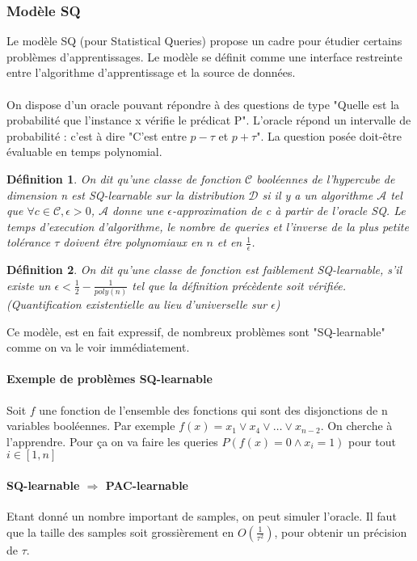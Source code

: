 \documentclass{article}		%
\newtheorem{defi}{Définition}
\theoremstyle{definition}
\theoremstyle{plain}
\begin{document}
\subsubsection{Modèle SQ}
Le modèle SQ (pour Statistical Queries) propose un cadre pour étudier
certains problèmes d'apprentissages. Le modèle se définit comme une
interface restreinte entre l'algorithme d'apprentissage et la source de
données.
\\
\\
On dispose d'un oracle pouvant répondre à des questions de type "Quelle
est la probabilité que l'instance x vérifie le prédicat P". L'oracle
répond un intervalle de probabilité : c'est à dire "C'est entre
$p - \tau$ et $p + \tau$". La question posée doit-être évaluable
en temps polynomial.
\\
\begin{defi}
On dit qu'une classe de fonction $\mathcal{C}$ booléennes de l'hypercube
de dimension n est SQ-learnable sur la
distribution $\mathcal{D}$ si il y a un algorithme $\mathcal{A}$
tel que $\forall c \in \mathcal{C}, \epsilon>0$, $\mathcal{A}$ donne une
$\epsilon$-approximation de c à partir de l'oracle SQ. Le temps
d'execution d'algorithme, le nombre de queries et l'inverse de la plus
petite tolérance $\tau$ doivent être polynomiaux en $n$ et en
$\frac{1}{\epsilon}$. 
\end{defi}
\begin{defi}
On dit qu'une classe de fonction est faiblement SQ-learnable, s'il existe
un $\epsilon<\frac{1}{2}-\frac{1}{poly(n)}$ tel que la définition
précèdente soit vérifiée.(Quantification existentielle au lieu
d'universelle sur $\epsilon$) 
\end{defi}
Ce modèle, est en fait expressif, de nombreux problèmes sont
"SQ-learnable" comme on va le voir immédiatement.
\paragraph{Exemple de problèmes SQ-learnable}
Soit $f$ une fonction de l'ensemble des fonctions qui sont des
disjonctions de n variables booléennes. Par exemple
$f(x)=x_1 \vee x_4 \vee \dots \vee x_{n-2}$.
On cherche à l'apprendre. Pour ça on va faire les queries
$P(f(x)=0\wedge x_i=1)$ pour tout $i\in [1,n]$ 
\paragraph{SQ-learnable $\Rightarrow$ PAC-learnable}
Etant donné un nombre important de samples, on peut simuler l'oracle. Il
faut que la taille des samples soit grossièrement en
$O(\frac{1}{\tau^2})$, pour obtenir un précision de $\tau$.
  
\end{document}
